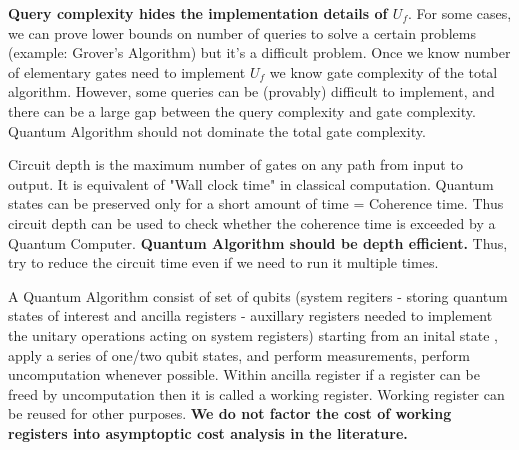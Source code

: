 \documentclass[12pt, oneside]{book}
\theoremstyle{definition}
\theoremstyle{definition}
\theoremstyle{remark}
\begin{document}
\textbf{Query complexity hides the implementation details of $U_f$}. For some cases, we can prove lower bounds on number of queries to solve a certain problems (example: Grover's Algorithm) but it's 
a difficult problem.
Once we know number of elementary gates need to implement $U_f$ we know gate complexity of the total algorithm.
However, some queries can be (provably) difficult to implement, and there can be a large gap between the query complexity and gate
complexity.  Quantum Algorithm should not dominate the total gate complexity. 

Circuit depth is the maximum number of gates on any path from input to output. It is equivalent of "Wall clock time" 
in classical computation. Quantum states can be preserved only for a short amount of time = Coherence time.
Thus circuit depth can be used to check whether the coherence time is exceeded by a Quantum Computer.
\textbf{Quantum Algorithm should be depth efficient.} Thus, try to reduce the circuit time even if we need to run it multiple times.

A Quantum Algorithm consist of set of qubits (system regiters - storing quantum states of interest and ancilla registers - 
auxillary registers needed to implement the unitary operations acting on system registers) starting from an inital state
, apply a series of one/two qubit states, and perform measurements, perform uncomputation whenever possible. 
Within ancilla register if a register can be freed by uncomputation then it is called a working register. Working register can be 
reused for other purposes. \textbf{We do not factor the cost of working registers into asymptoptic cost analysis in the literature.}
\end{document}
